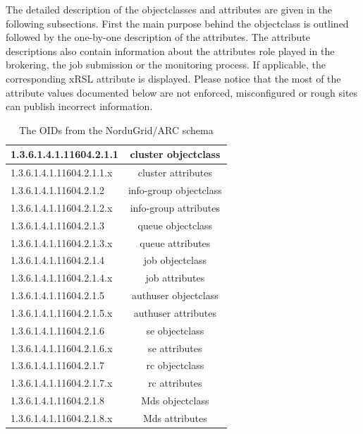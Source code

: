 \documentclass{article}
\begin{document}
The detailed description of the objectclasses and attributes 
are given in the following subsections. First the main purpose  
behind the objectclass is outlined followed by the one-by-one 
description of the attributes. The attribute descriptions also contain 
information about the attributes role played in the brokering\cite{arc_brokering},
the job submission or the monitoring process. If applicable, the corresponding 
xRSL attribute\cite{xrsl_manual} is displayed. 
Please notice that the most of the attribute values documented below are not enforced, 
misconfigured or rough sites can publish incorrect information.





\begin{table}
\centering
\begin{tabular}{|l|c|}
\hline 
1.3.6.1.4.1.11604.2.1.1&
cluster objectclass\tabularnewline
\hline 
1.3.6.1.4.1.11604.2.1.1.x&
cluster attributes\tabularnewline
\hline 
1.3.6.1.4.1.11604.2.1.2&
info-group objectclass\tabularnewline
\hline 
1.3.6.1.4.1.11604.2.1.2.x&
info-group attributes\tabularnewline
\hline 
1.3.6.1.4.1.11604.2.1.3 &
queue objectclass\tabularnewline
\hline 
1.3.6.1.4.1.11604.2.1.3.x&
queue attributes\tabularnewline
\hline 
1.3.6.1.4.1.11604.2.1.4&
job objectclass\tabularnewline
\hline 
1.3.6.1.4.1.11604.2.1.4.x&
job attributes\tabularnewline
\hline 
1.3.6.1.4.1.11604.2.1.5&
authuser objectclass\tabularnewline
\hline 
1.3.6.1.4.1.11604.2.1.5.x&
authuser attributes\tabularnewline
\hline 
1.3.6.1.4.1.11604.2.1.6&
se objectclass\tabularnewline
\hline 
1.3.6.1.4.1.11604.2.1.6.x&
se attributes\tabularnewline
\hline 
1.3.6.1.4.1.11604.2.1.7 &
rc objectclass\tabularnewline
\hline 
1.3.6.1.4.1.11604.2.1.7.x&
rc attributes\tabularnewline
\hline 
1.3.6.1.4.1.11604.2.1.8 &
Mds objectclass\tabularnewline
\hline 
1.3.6.1.4.1.11604.2.1.8.x&
Mds attributes\tabularnewline
\hline 
\end{tabular}
\caption{\label{Table:OID2} The OIDs from the NorduGrid/ARC schema}
\end{table}
\end{document}

